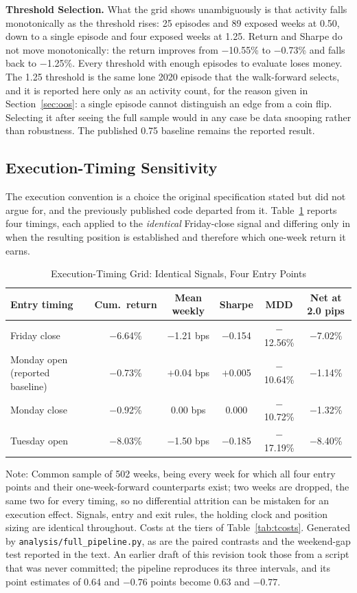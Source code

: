 \documentclass[11pt]{article}
\begin{document}
\textbf{Threshold Selection.} What the grid shows unambiguously is that activity falls monotonically as the threshold rises: 25 episodes and 89 exposed weeks at 0.50, down to a single episode and four exposed weeks at 1.25. Return and Sharpe do not move monotonically: the return improves from $-$10.55\% to $-$0.73\% and falls back to $-$1.25\%. Every threshold with enough episodes to evaluate loses money. The 1.25 threshold is the same lone 2020 episode that the walk-forward selects, and it is reported here only as an activity count, for the reason given in Section~\ref{sec:oos}: a single episode cannot distinguish an edge from a coin flip. Selecting it after seeing the full sample would in any case be data snooping rather than robustness. The published 0.75 baseline remains the reported result.

\subsection{Execution-Timing Sensitivity}
\label{sec:exectiming}

The execution convention is a choice the original specification stated but did not argue for, and the previously published code departed from it. Table~\ref{tab:exectiming} reports four timings, each applied to the \emph{identical} Friday-close signal and differing only in when the resulting position is established and therefore which one-week return it earns.

\begin{table}[H]
\centering
\caption{Execution-Timing Grid: Identical Signals, Four Entry Points}
\label{tab:exectiming}
\small
\begin{tabular}{@{}lccccc@{}}
\toprule
Entry timing & Cum.\ return & Mean weekly & Sharpe & MDD & Net at 2.0 pips \\
\midrule
Friday close & $-$6.64\% & $-$1.21 bps & $-$0.154 & $-$12.56\% & $-$7.02\% \\
Monday open (reported baseline) & $-$0.73\% & $+$0.04 bps & $+$0.005 & $-$10.64\% & $-$1.14\% \\
Monday close & $-$0.92\% & 0.00 bps & 0.000 & $-$10.72\% & $-$1.32\% \\
Tuesday open & $-$8.03\% & $-$1.50 bps & $-$0.185 & $-$17.19\% & $-$8.40\% \\
\bottomrule
\end{tabular}
\par\vspace{0.3em}
\parbox{\linewidth}{\footnotesize Note: Common sample of 502 weeks, being every week for which all four entry points and their one-week-forward counterparts exist; two weeks are dropped, the same two for every timing, so no differential attrition can be mistaken for an execution effect. Signals, entry and exit rules, the holding clock and position sizing are identical throughout. Costs at the tiers of Table~\ref{tab:tcosts}. Generated by \texttt{analysis/full\_pipeline.py}, as are the paired contrasts and the weekend-gap test reported in the text. An earlier draft of this revision took those from a script that was never committed; the pipeline reproduces its three intervals, and its point estimates of 0.64 and $-0.76$ points become 0.63 and $-0.77$.}
\end{table}
\end{document}
